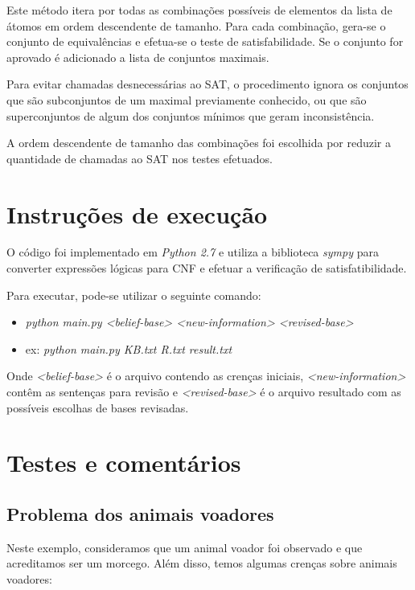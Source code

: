 \documentclass[10pt,a4paper]{amsart}
\begin{document}
Este método itera por todas as combinações possíveis de elementos da lista de átomos em ordem descendente de tamanho. Para cada combinação, gera-se o conjunto de equivalências e efetua-se o teste de satisfabilidade. Se o conjunto for aprovado é adicionado a lista de conjuntos maximais.

Para evitar chamadas desnecessárias ao SAT, o procedimento ignora os conjuntos que são subconjuntos de um maximal previamente conhecido, ou que são superconjuntos de algum dos conjuntos mínimos que geram inconsistência.

A ordem descendente de tamanho das combinações foi escolhida por reduzir a quantidade de chamadas ao SAT nos testes efetuados.

\section{Instruções de execução}
O código foi implementado em \emph{Python 2.7} e utiliza a biblioteca \emph{sympy} para converter expressões lógicas para CNF e efetuar a verificação de satisfatibilidade.

Para executar, pode-se utilizar o seguinte comando:
\begin{itemize}
 \item[] \emph{python main.py <belief-base> <new-information> <revised-base>}
 \item[] ex: \emph{python main.py KB.txt R.txt result.txt}
\end{itemize}

Onde \emph{<belief-base>} é o arquivo contendo as crenças iniciais, \emph{<new-information>} contêm as sentenças para revisão e \emph{<revised-base>} é o arquivo resultado com as possíveis escolhas de bases revisadas.

\section{Testes e comentários}

\subsection{Problema dos animais voadores}
Neste exemplo, consideramos que um animal voador foi observado e que acreditamos ser um morcego. Além disso, temos algumas crenças sobre animais voadores:
\end{document}
